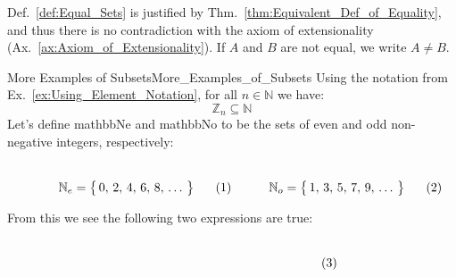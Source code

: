         Def.~\ref{def:Equal_Sets} is justified by
        Thm.~\ref{thm:Equivalent_Def_of_Equality}, and thus there is no
        contradiction with the axiom of extensionality
        (Ax.~\ref{ax:Axiom_of_Extensionality}). If $A$ and $B$ are not equal, we
        write $A\ne{B}$. 
        \begin{lexample}{More Examples of Subsets}{More_Examples_of_Subsets}
            Using the notation from Ex.~\ref{ex:Using_Element_Notation}, for all
            $n\in\mathbb{N}$ we have:
            \begin{equation}
                \mathbb{Z}_{n}\subseteq\mathbb{N}
            \end{equation}
            Let's define \gls{mathbbNe} and \gls{mathbbNo} to be the sets of
            even and odd
            non-negative integers, respectively:
            \par
            \begin{subequations}
                \begin{minipage}[b]{0.49\textwidth}
                    \centering
                    \begin{equation}
                        \label{eqn:Even_Pos_Ints_Ellipses}%
                        \mathbb{N}_{e}=\big\{\,0,\,2,\,4,\,6,\,8,\,\dots\,\big\}
                    \end{equation}
                \end{minipage}
                \hfill
                \begin{minipage}[b]{0.49\textwidth}
                    \centering
                    \begin{equation}
                        \label{eqn:Odd_Pos_Ints_Ellipses}%
                        \mathbb{N}_{o}=\big\{\,1,\,3,\,5,\,7,\,9,\,\dots\,\big\}
                    \end{equation}
                \end{minipage}
            \end{subequations}
            \par\vspace{2.5ex}
            From this we see the following two expressions are true:
            \par
            \begin{subequations}
                \begin{minipage}[b]{0.49\textwidth}
                    \centering
                    \begin{equation}

\end{equation}
\end{minipage}
\end{subequations}
\end{lexample}
